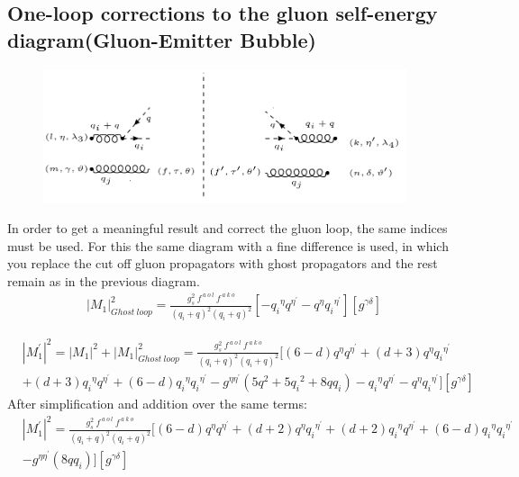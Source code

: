 \subsection{One-loop corrections to the gluon self-energy diagram(Gluon-Emitter Bubble)}
\begin{figure}[h!]
\centering
\includegraphics[width=0.95\textwidth]{images/GG/Ghost.png}
\end{figure}
In order to get a meaningful result and correct the gluon loop, the same indices must be used. For this the same diagram with a fine difference is used, in which you replace the cut off gluon propagators with ghost propagators and the rest remain as in the previous diagram.
\begin{equation}
\begin{split}
{{|M_1|}^2_{Ghost \:loop}}=\frac{g_s^2 \:f^{\:a\:o\:l}\: f^{\:a\:k\:o}}{(q_i +q)^2 (q_i +q)^2} [-{q_i}^{{\eta}}{q}^{{\eta}^{\prime}}-{q}^{{\eta}}{q_i}^{{\eta}^{\prime}}][g^{{\gamma}{\delta}}]
\end{split}
\end{equation}

\begin{equation}
\begin{split}
&{|{M}^{\prime}_1|}^2 = {|M_1|}^2+{{|M_1|}^2_{Ghost \:loop}}=\frac{g_s^2 \:f^{\:a\:o\:l}\: f^{\:a\:k\:o}}{(q_i +q)^2 (q_i +q)^2}  [(6-d){q}^{{\eta}}{q}^{{\eta}^{\prime}}+(d+3){q}^{{\eta}}{q_i}^{{\eta}^{\prime}}\\
&+(d+3){q_i}^{{\eta}}{q}^{{\eta}^{\prime}}+(6-d){q_i}^{{\eta}}{q_i}^{{\eta}^{\prime}}-g^{{\eta}{{\eta}^{\prime}}}(5{q}^2+5{q_i}^2+8qq_i)-{q_i}^{{\eta}}{q}^{{\eta}^{\prime}}-{q}^{{\eta}}{q_i}^{{\eta}^{\prime}}][g^{{\gamma}{\delta}}]
\end{split}
\end{equation}
After simplification and addition over the same terms:
\begin{equation}
\begin{split}
&{|{M}^{\prime}_1|}^2 =\frac{g_s^2 \:f^{\:a\:o\:l}\: f^{\:a\:k\:o}}{(q_i +q)^2 (q_i +q)^2}  [(6-d){q}^{{\eta}}{q}^{{\eta}^{\prime}}+(d+2){q}^{{\eta}}{q_i}^{{\eta}^{\prime}}+(d+2){q_i}^{{\eta}}{q}^{{\eta}^{\prime}}+(6-d){q_i}^{{\eta}}{q_i}^{{\eta}^{\prime}}\\
&-g^{{\eta}{{\eta}^{\prime}}}(8qq_i)][g^{{\gamma}{\delta}}]
\end{split}
\end{equation}


